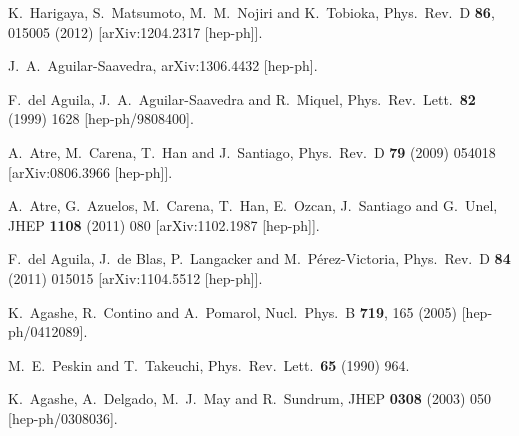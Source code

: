 \documentclass[12pt,a4paper]{article}
\begin{document}
\begin{thebibliography}{99}
 K.~Harigaya, S.~Matsumoto, M.~M.~Nojiri and K.~Tobioka,
 Phys.\ Rev.\ D {\bf 86}, 015005 (2012)
 [arXiv:1204.2317 [hep-ph]].



  J.~A.~Aguilar-Saavedra,
  arXiv:1306.4432 [hep-ph].




  F.~del Aguila, J.~A.~Aguilar-Saavedra and R.~Miquel,
  Phys.\ Rev.\ Lett.\  {\bf 82} (1999) 1628
  [hep-ph/9808400].

  A.~Atre, M.~Carena, T.~Han and J.~Santiago,
  Phys.\ Rev.\ D {\bf 79} (2009) 054018
  [arXiv:0806.3966 [hep-ph]].

  A.~Atre, G.~Azuelos, M.~Carena, T.~Han, E.~Ozcan, J.~Santiago and G.~Unel,
  JHEP {\bf 1108} (2011) 080
  [arXiv:1102.1987 [hep-ph]].

  F.~del Aguila, J.~de Blas, P.~Langacker and M.~P\'erez-Victoria,
  Phys.\ Rev.\ D {\bf 84} (2011) 015015
  [arXiv:1104.5512 [hep-ph]].

  K.~Agashe, R.~Contino and A.~Pomarol,
  Nucl.\ Phys.\ B {\bf 719}, 165 (2005)
  [hep-ph/0412089].


  M.~E.~Peskin and T.~Takeuchi,
  Phys.\ Rev.\ Lett.\  {\bf 65} (1990) 964.


  K.~Agashe, A.~Delgado, M.~J.~May and R.~Sundrum,
  JHEP {\bf 0308} (2003) 050
  [hep-ph/0308036].


\end{thebibliography}
\end{document}
